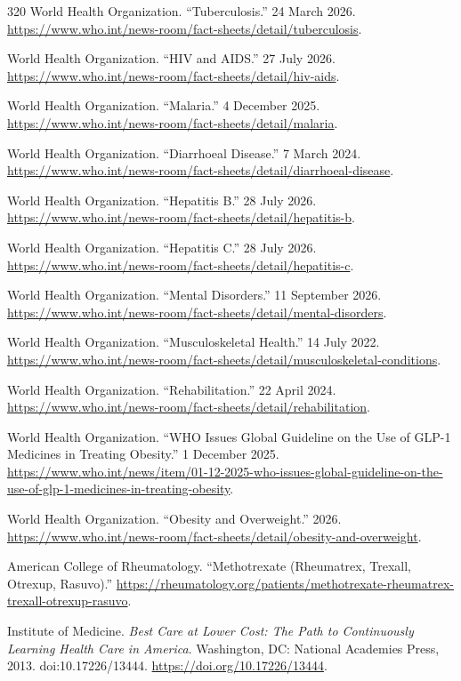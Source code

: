 \documentclass[12pt,oneside]{book}
\begin{document}
\begin{thebibliography}{320}
World Health Organization. ``Tuberculosis.'' 24 March 2026.
\url{https://www.who.int/news-room/fact-sheets/detail/tuberculosis}.

World Health Organization. ``HIV and AIDS.'' 27 July 2026.
\url{https://www.who.int/news-room/fact-sheets/detail/hiv-aids}.

World Health Organization. ``Malaria.'' 4 December 2025.
\url{https://www.who.int/news-room/fact-sheets/detail/malaria}.

World Health Organization. ``Diarrhoeal Disease.'' 7 March 2024.
\url{https://www.who.int/news-room/fact-sheets/detail/diarrhoeal-disease}.

World Health Organization. ``Hepatitis B.'' 28 July 2026.
\url{https://www.who.int/news-room/fact-sheets/detail/hepatitis-b}.

World Health Organization. ``Hepatitis C.'' 28 July 2026.
\url{https://www.who.int/news-room/fact-sheets/detail/hepatitis-c}.

World Health Organization. ``Mental Disorders.'' 11 September 2026.
\url{https://www.who.int/news-room/fact-sheets/detail/mental-disorders}.

World Health Organization. ``Musculoskeletal Health.'' 14 July 2022.
\url{https://www.who.int/news-room/fact-sheets/detail/musculoskeletal-conditions}.

World Health Organization. ``Rehabilitation.'' 22 April 2024.
\url{https://www.who.int/news-room/fact-sheets/detail/rehabilitation}.

World Health Organization. ``WHO Issues Global Guideline on the Use of GLP-1
Medicines in Treating Obesity.'' 1 December 2025.
\url{https://www.who.int/news/item/01-12-2025-who-issues-global-guideline-on-the-use-of-glp-1-medicines-in-treating-obesity}.

World Health Organization. ``Obesity and Overweight.'' 2026.
\url{https://www.who.int/news-room/fact-sheets/detail/obesity-and-overweight}.

American College of Rheumatology. ``Methotrexate (Rheumatrex, Trexall, Otrexup,
Rasuvo).''
\url{https://rheumatology.org/patients/methotrexate-rheumatrex-trexall-otrexup-rasuvo}.

Institute of Medicine. \emph{Best Care at Lower Cost: The Path to Continuously
Learning Health Care in America}. Washington, DC: National Academies Press,
2013. doi:10.17226/13444.
\url{https://doi.org/10.17226/13444}.


\end{thebibliography}
\end{document}
